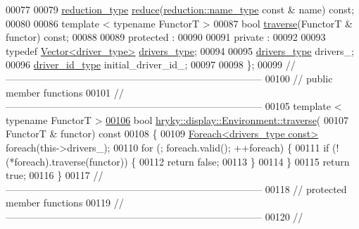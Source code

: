 \begin{DoxyCode}
00077 
00079     \hyperlink{classhryky_1_1_intrusive_ptr}{reduction_type} \hyperlink{classhryky_1_1display_1_1_environment_a1983f9c09e1bae5ae132b704874f0f68}{reduce}(\hyperlink{classhryky_1_1reduction_1_1_string}{reduction::name_type} \textcolor{keyword}{const} & name) \textcolor{keyword}{const};
00080 
00086     \textcolor{keyword}{template} < \textcolor{keyword}{typename} FunctorT >
00087     \textcolor{keywordtype}{bool} \hyperlink{classhryky_1_1display_1_1_environment_a249714e231c16676ade24abbf9570a30}{traverse}(FunctorT & functor) \textcolor{keyword}{const};
00088 
00089 \textcolor{keyword}{protected} :
00090 
00091 \textcolor{keyword}{private} :
00092 
00093     \textcolor{keyword}{typedef} \hyperlink{classhryky_1_1_vector}{Vector<driver_type>} \hyperlink{classhryky_1_1_vector}{drivers_type};
00094 
00095     \hyperlink{classhryky_1_1_vector}{drivers_type}    drivers\_;
00096     \hyperlink{namespacehryky_1_1display_a438d20137cf00d71a4a72dfb7233ec90}{driver_id_type}  initial\_driver\_id\_;
00097 
00098 \};
00099 \textcolor{comment}{//
      ------------------------------------------------------------------------------}
00100 \textcolor{comment}{// public member functions}
00101 \textcolor{comment}{//
      ------------------------------------------------------------------------------}
00105 \textcolor{comment}{}\textcolor{keyword}{template} < \textcolor{keyword}{typename} FunctorT >
\hypertarget{display__environment_8h_source_l00106}{}\hyperlink{classhryky_1_1display_1_1_environment_a249714e231c16676ade24abbf9570a30}{00106} \textcolor{keywordtype}{bool} \hyperlink{classhryky_1_1display_1_1_environment_a249714e231c16676ade24abbf9570a30}{hryky::display::Environment::traverse}(
00107     FunctorT & functor)\textcolor{keyword}{ const}
00108 \textcolor{keyword}{}\{
00109     \hyperlink{classhryky_1_1_foreach}{Foreach<drivers_type const>} \textcolor{keywordflow}{foreach}(this->drivers\_);
00110     \textcolor{keywordflow}{for} (; \textcolor{keywordflow}{foreach}.valid(); ++\textcolor{keywordflow}{foreach}) \{
00111         \textcolor{keywordflow}{if} (!(*foreach).traverse(functor)) \{
00112             \textcolor{keywordflow}{return} \textcolor{keyword}{false};
00113         \}
00114     \}
00115     \textcolor{keywordflow}{return} \textcolor{keyword}{true};
00116 \}
00117 \textcolor{comment}{//
      ------------------------------------------------------------------------------}
00118 \textcolor{comment}{// protected member functions}
00119 \textcolor{comment}{//
      ------------------------------------------------------------------------------}
00120 \textcolor{comment}{//
}
\end{DoxyCode}
